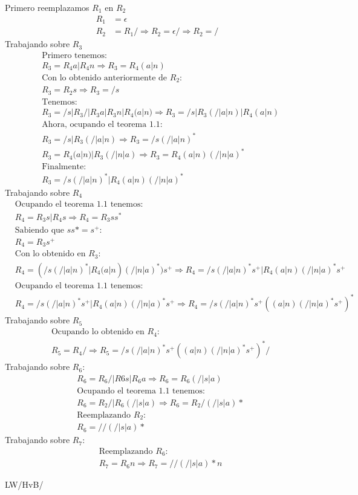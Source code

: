 \documentclass[spanish, fleqn]{article}
\begin{document}
\begin{enumerate}
    Primero reemplazamos $R_{1}$ en $R_{2}$
    \begin{align*}
    R_{1}&=\epsilon \\
    R_{2}&=R_{1}/ \Rightarrow R_{2}=\epsilon/ \Rightarrow R_{2}=/
    \end{align*}
    Trabajando sobre $R_3$
    \begin{align*}
    &\text{Primero tenemos:}\\
    &R_3=R_{4}a|R_{4}n \Rightarrow R_3=R_4(a|n)\\
    &\text{Con lo obtenido anteriormente de $R_2$:}\\
    &R_3=R_2s \Rightarrow R_3=/s\\
    &\text{Tenemos:}\\
    &R_3=/s|R_{3}/|R_{3}a|R_{3}n|R_4(a|n) \Rightarrow R_3=/s|R_3(/|a|n)|R_4(a|n) \\
    &\text{Ahora, ocupando el teorema 1.1:}\\
    &R_3=/s|R_3(/|a|n) \Rightarrow R_3=/s(/|a|n)^*\\
    &R_3=R_4(a|n)|R_3(/|n|a) \Rightarrow R_3=R_4(a|n)(/|n|a)^*\\
    &\text{Finalmente:}\\
    &R_3=/s(/|a|n)^*|R_4(a|n)(/|n|a)^*
    \end{align*}
    Trabajando sobre $R_4$
    \begin{align*}
    &\text{Ocupando el teorema 1.1 tenemos:}\\
    &R_4=R_3s|R_4s \Rightarrow R_4=R_3ss^*\\
    &\text{Sabiendo que $ss*=s^+$:}\\
    &R_4=R_3s^+\\
    &\text{Con lo obtenido en $R_3$:}\\
    &R_4=(/s(/|a|n)^*|R_4(a|n)(/|n|a)^*)s^+ \Rightarrow R_4=/s(/|a|n)^*s^+|R_4(a|n)(/|n|a)^*s^+\\
    &\text{Ocupando el teorema 1.1 tenemos:}\\
    &R_4=/s(/|a|n)^*s^+|R_4(a|n)(/|n|a)^*s^+ \Rightarrow R_4=/s(/|a|n)^*s^+((a|n)(/|n|a)^*s^+)^*
    \end{align*}
    Trabajando sobre $R_5$
    \begin{align*}
	&\text{Ocupando lo obtenido en $R_4$:}\\
    &R_5=R_4/ \Rightarrow R_5=/s(/|a|n)^*s^+((a|n)(/|n|a)^*s^+)^*/
    \end{align*}
    Trabajando sobre $R_6$:
    \begin{align*}
	&R_6=R_{6}/|R{6}s|R_{6}a \Rightarrow R_6=R_6(/|s|a)\\
	&\text{Ocupando el teorema 1.1 tenemos:}\\
	&R_6=R_2/|R_6(/|s|a) \Rightarrow R_6=R_2/(/|s|a)*\\
	&\text{Reemplazando $R_2$:}\\
	&R_6=//(/|s|a)*
    \end{align*}
    Trabajando sobre $R_7$:
    \begin{align*}
    &\text{Reemplazando $R_6$:}\\
    &R_7=R_6n \Rightarrow R_7=//(/|s|a)*n
    \end{align*}
  \end{enumerate}


  \vfill\hfill LW/HvB/\LaTeXe
\end{document}
